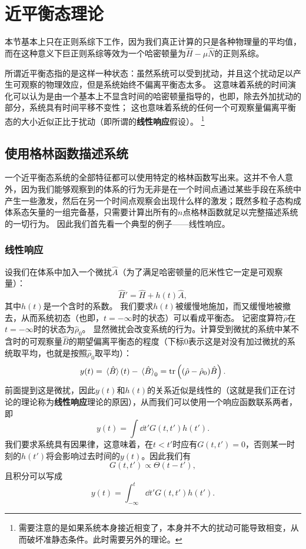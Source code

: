 \documentclass[hyperref, UTF8, a4paper]{ctexart}
\begin{document}
\section{近平衡态理论}


本节基本上只在正则系综下工作，因为我们真正计算的只是各种物理量的平均值，而在这种意义下巨正则系综等效为一个哈密顿量为$\hat{H}-\mu\hat{N}$的正则系综。

所谓近平衡态指的是这样一种状态：虽然系统可以受到扰动，并且这个扰动足以产生可观察的物理效应，但是系统始终不偏离平衡态太多。
这意味着系统的时间演化可以认为是由一个基本上不显含时间的哈密顿量指导的，也即，除去外加扰动的部分，系统具有时间平移不变性；
这也意味着系统的任何一个可观察量偏离平衡态的大小近似正比于扰动（即所谓的\textbf{线性响应}假设）。%
\footnote{需要注意的是如果系统本身接近相变了，本身并不大的扰动可能导致相变，从而破坏准静态条件。此时需要另外的理论。}%

\subsection{使用格林函数描述系统}

一个近平衡态系统的全部特征都可以使用特定的格林函数写出来。这并不令人意外，因为我们能够观察到的体系的行为无非是在一个时间点通过某些手段在系统中产生一些激发，然后在另一个时间点观察会出现什么样的激发；既然多粒子态构成体系态矢量的一组完备基，只需要计算出所有的$n$点格林函数就足以完整描述系统的一切行为。
因此我们首先看一个典型的例子——线性响应。

\subsubsection{线性响应}\label{sec:linear-response}

设我们在体系中加入一个微扰$\hat{A}$（为了满足哈密顿量的厄米性它一定是可观察量）：
\begin{equation}
    \hat{H}' = \hat{H} + h(t) \hat{A},
\end{equation}
其中$h(t)$是一个含时的系数。
我们要求$h(t)$被缓慢地施加，而又缓慢地被撤去，从而系统初态（也即，$t=-\infty$时的状态）可以看成平衡态。
记密度算符$\hat{\rho}$在$t=-\infty$时的状态为$\hat{\rho}_0$。
显然微扰会改变系统的行为。计算受到微扰的系统中某不含时的可观察量$\hat{B}$的期望偏离平衡态的程度（下标0表示这是对没有加过微扰的系统取平均，也就是按照$\hat{\rho}_0$取平均）：
\[
    y(t) = \expval*{\hat{B}}(t) - \expval*{\hat{B}}_0 = \trace\left((\hat{\rho} - \hat{\rho}_0)\hat{B}\right).
\]
前面提到这是微扰，因此$y(t)$和$h(t)$的关系近似是线性的（这就是我们正在讨论的理论称为\textbf{线性响应}理论的原因），从而我们可以使用一个响应函数联系两者，即
\[
    y(t) = \int \dd{t'} G(t, t') h(t').
\]
我们要求系统具有因果律，这意味着，在$t<t'$时应有$G(t,t')=0$，否则某一时刻的$h(t')$将会影响过去时间的$y(t)$。因此我们有
\[
    G(t,t') \propto \Theta(t-t'),
\]
且积分可以写成
\[
    y(t) = \int_{-\infty}^t \dd{t'} G(t, t') h(t').
\]
\end{document}
